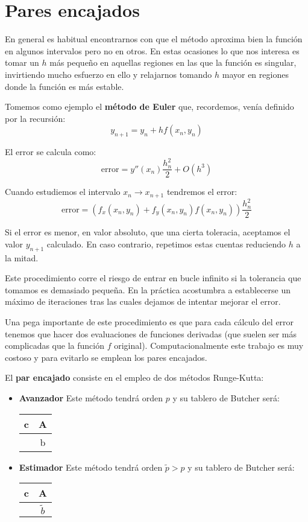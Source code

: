 \section{Pares encajados}

En general es habitual encontrarnos con que el método aproxima bien la función en algunos intervalos pero no en otros. En estas ocasiones lo que nos interesa es tomar un $h$ más pequeño en aquellas regiones en las que la función es singular, invirtiendo mucho esfuerzo en ello y relajarnos tomando $h$ mayor en regiones donde la función es más estable.

Tomemos como ejemplo el \textbf{método de Euler} que, recordemos, venía definido por la recursión:
\[y_{n+1} = y_n + h f(x_n,y_n)\]

El error se calcula como:
\[\text{error} = y''(x_n)\frac{h_n^2}{2}+O(h^3)\]

Cuando estudiemos el intervalo $x_n \to x_{n+1}$ tendremos el error:
\[\text{error} = \left(f_x(x_n,y_n)+f_y(x_n,y_n)f(x_n,y_n) \right)\frac{h_n^2}{2}\]

Si el error es menor, en valor absoluto, que una cierta toleracia, aceptamos el valor $y_{n+1}$ calculado. En caso contrario, repetimos estas cuentas reduciendo $h$ a la mitad.

\obs Este procedimiento corre el riesgo de entrar en bucle infinito si la tolerancia que tomamos es demasiado pequeña. En la práctica acostumbra a establecerse un máximo de iteraciones tras las cuales dejamos de intentar mejorar el error.

Una pega importante de este procedimiento es que para cada cálculo del error tenemos que hacer dos evaluaciones de funciones derivadas (que suelen ser más complicadas que la función $f$ original). Computacionalmente este trabajo es muy costoso y para evitarlo se emplean los pares encajados.

El \textbf{par encajado} consiste en el empleo de dos métodos Runge-Kutta:
\begin{itemize}
\item \textbf{Avanzador}
Este método tendrá orden $p$ y su tablero de Butcher será:

\begin{center}
\begin{tabular}{c|c}
c & A \\
\hline
 & b\\
\end{tabular}
\end{center}


\item \textbf{Estimador}
Este método tendrá orden $\tilde{p}>p$ y su tablero de Butcher será:

\begin{center}
\begin{tabular}{c|c}
c & A \\
\hline
 & $\tilde{b}$\\
\end{tabular}
\end{center}
\end{itemize}

